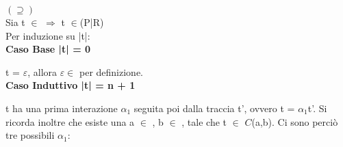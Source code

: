 $(\supseteq)$ 
\\

Sia t $\in$  $\Rightarrow$  t $\in$(P|R)\\
Per induzione su |t|:\\

\textbf{Caso Base |t| = 0}

t = $\varepsilon$, allora $\varepsilon \in$  per definizione.\\


\textbf{Caso Induttivo |t| = n + 1}


t ha una prima interazione $\alpha_{1}$ seguita poi dalla traccia t', ovvero t = $\alpha_{1}$t'. Si ricorda inoltre che esiste una a $\in$ , b $\in$ , tale che t $\in$ $C$(a,b). Ci sono perciò tre possibili $\alpha_{1}$:

